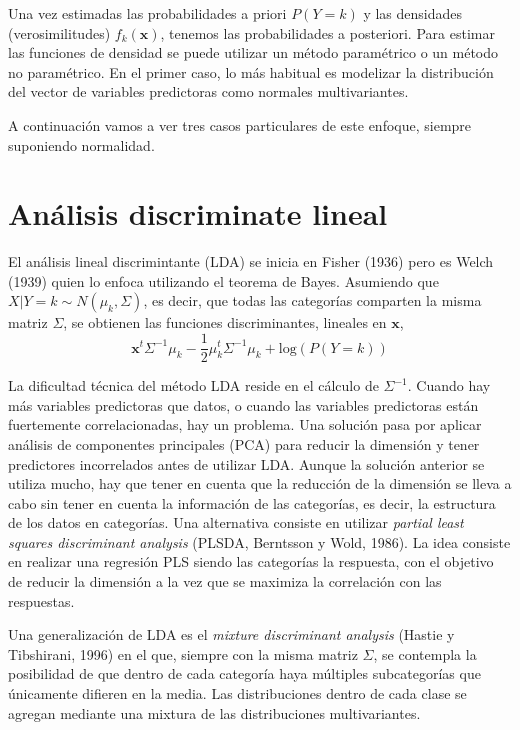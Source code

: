 \documentclass[
]{book}
\theoremstyle{break}
\theoremstyle{definition}
\theoremstyle{definition}
\theoremstyle{definition}
\theoremstyle{definition}
\theoremstyle{remark}
\begin{document}
Una vez estimadas las probabilidades a priori \(P(Y = k)\) y las densidades (verosimilitudes) \(f_k(\mathbf{x})\), tenemos las probabilidades a posteriori. Para estimar las funciones de densidad se puede utilizar un método paramétrico o un método no paramétrico. En el primer caso, lo más habitual es modelizar la distribución del vector de variables predictoras como normales multivariantes.

A continuación vamos a ver tres casos particulares de este enfoque, siempre suponiendo normalidad.

\hypertarget{anuxe1lisis-discriminate-lineal}{%
\section{Análisis discriminate lineal}\label{anuxe1lisis-discriminate-lineal}}

El análisis lineal discrimintante (LDA) se inicia en Fisher (1936) pero es Welch (1939) quien lo enfoca utilizando el teorema de Bayes. Asumiendo que \(X | Y = k \sim N(\mu_k, \Sigma)\), es decir, que todas las categorías comparten la misma matriz \(\Sigma\), se obtienen las funciones discriminantes, lineales en \(\mathbf{x}\),
\[\mathbf{x}^t \Sigma^{-1} \mu_k - \frac{1}{2} \mu_k^t \Sigma^{-1} \mu_k + \mbox{log}(P(Y = k))\]

La dificultad técnica del método LDA reside en el cálculo de \(\Sigma^{-1}\). Cuando hay más variables predictoras que datos, o cuando las variables predictoras están fuertemente correlacionadas, hay un problema. Una solución pasa por aplicar análisis de componentes principales (PCA) para reducir la dimensión y tener predictores incorrelados antes de utilizar LDA. Aunque la solución anterior se utiliza mucho, hay que tener en cuenta que la reducción de la dimensión se lleva a cabo sin tener en cuenta la información de las categorías, es decir, la estructura de los datos en categorías. Una alternativa consiste en utilizar \emph{partial least squares discriminant analysis} (PLSDA, Berntsson y Wold, 1986). La idea consiste en realizar una regresión PLS siendo las categorías la respuesta, con el objetivo de reducir la dimensión a la vez que se maximiza la correlación con las respuestas.

Una generalización de LDA es el \emph{mixture discriminant analysis} (Hastie y Tibshirani, 1996) en el que, siempre con la misma matriz \(\Sigma\), se contempla la posibilidad de que dentro de cada categoría haya múltiples subcategorías que únicamente difieren en la media. Las distribuciones dentro de cada clase se agregan mediante una mixtura de las distribuciones multivariantes.
\end{document}
